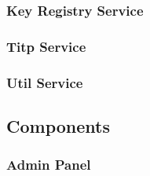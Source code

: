 \subsubsection{Key Registry Service}

\subsubsection{Titp Service}

\subsubsection{Util Service}

\subsection{Components}\label{subsec:components}

\subsubsection{Admin Panel}


